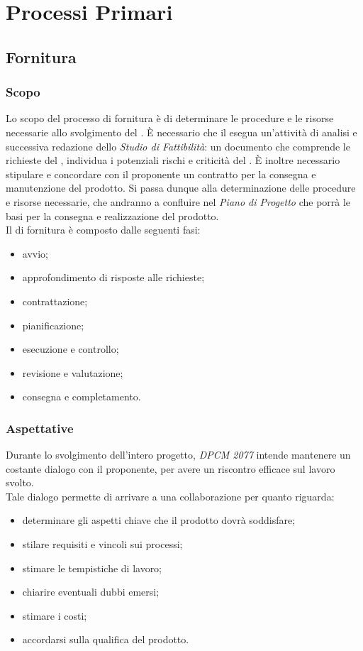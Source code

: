 \section{Processi Primari}
	\subsection{Fornitura}
		\subsubsection{Scopo}
		Lo scopo del processo di fornitura è di determinare le procedure e le risorse necessarie allo
		svolgimento del . È necessario che il  esegua un'attività di analisi e successiva redazione dello \textit{Studio di Fattibilità}: un documento che comprende le richieste del , individua i potenziali rischi e criticità del .
		È inoltre necessario stipulare e concordare con il proponente un contratto per la consegna e manutenzione del prodotto. 
		Si passa dunque alla determinazione delle procedure e risorse necessarie, che andranno a confluire nel \textit{Piano di Progetto} che porrà le basi per la consegna e realizzazione del prodotto.
		\\
		Il  di fornitura è composto dalle seguenti fasi:
		\begin{itemize}
			\item avvio;
			\item approfondimento di risposte alle richieste;
			\item contrattazione;
			\item pianificazione;
			\item esecuzione e controllo;
			\item revisione e valutazione;
			\item consegna e completamento.
		\end{itemize}
		\subsubsection{Aspettative}
		Durante lo svolgimento dell'intero progetto, \textit{DPCM 2077} intende mantenere un costante dialogo con il proponente, per avere un riscontro efficace sul lavoro svolto.
		\\
		Tale dialogo permette di arrivare a una collaborazione per quanto riguarda:
		\begin{itemize}
			\item determinare gli aspetti chiave che il prodotto dovrà soddisfare;
			\item stilare requisiti e vincoli sui processi;
			\item stimare le tempistiche di lavoro;
			\item chiarire eventuali dubbi emersi;
			\item stimare i costi;
			\item accordarsi sulla qualifica del prodotto.
		\end{itemize}
